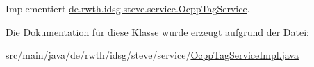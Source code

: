 Implementiert \hyperlink{interfacede_1_1rwth_1_1idsg_1_1steve_1_1service_1_1_ocpp_tag_service_afe5afe05ed4f072302ed4ed7622dba76}{de.\+rwth.\+idsg.\+steve.\+service.\+Ocpp\+Tag\+Service}.



Die Dokumentation für diese Klasse wurde erzeugt aufgrund der Datei\+:\begin{DoxyCompactItemize}
\item 
src/main/java/de/rwth/idsg/steve/service/\hyperlink{_ocpp_tag_service_impl_8java}{Ocpp\+Tag\+Service\+Impl.\+java}\end{DoxyCompactItemize}
